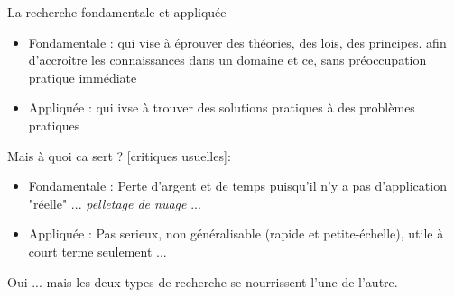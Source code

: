 \documentclass[french]{beamer}
\begin{document}
\begin{frame}{La recherche fondamentale et appliquée}
\begin{itemize}
	\item Fondamentale : qui vise à éprouver des théories, des lois, des principes. afin d'accroître les connaissances dans un domaine et ce, sans préoccupation pratique immédiate
	\item Appliquée : qui ivse à trouver des solutions pratiques à des problèmes pratiques
\end{itemize}
Mais à quoi ca sert ? [critiques usuelles]: 
\begin{itemize}
	\item Fondamentale : Perte d'argent et de temps puisqu'il n'y a pas d'application "réelle" ... \emph{pelletage de nuage} ... 
	\item Appliquée : Pas serieux, non généralisable (rapide et petite-échelle), utile à court terme seulement ...
\end{itemize}
Oui ... mais les deux types de recherche se nourrissent l'une de l'autre.
\end{frame}

\usetikzlibrary{calc,trees,positioning,arrows,%
decorations.pathreplacing,decorations.pathmorphing,%
matrix}
\end{document}
